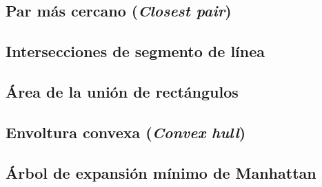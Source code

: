 \subsection{Par más cercano (\emph{Closest pair})}


\subsection{Intersecciones de segmento de línea}


\subsection{Área de la unión de rectángulos}


\subsection{Envoltura convexa (\emph{Convex hull})}


\subsection{Árbol de expansión mínimo de Manhattan}
